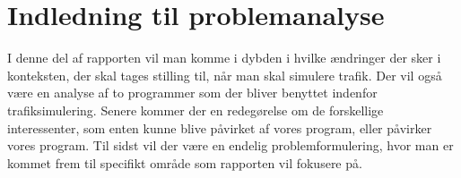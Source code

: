 
\chapter{Indledning til problemanalyse}
I denne del af rapporten vil man komme i dybden i hvilke ændringer der sker i konteksten, der skal tages stilling til, når man skal simulere trafik. Der vil også være en analyse af to programmer som der bliver benyttet indenfor trafiksimulering. Senere kommer der en redegørelse om de forskellige interessenter, som enten kunne blive påvirket af vores program, eller påvirker vores program. Til sidst vil der være en endelig problemformulering, hvor man er kommet frem til specifikt område som rapporten vil fokusere på.

